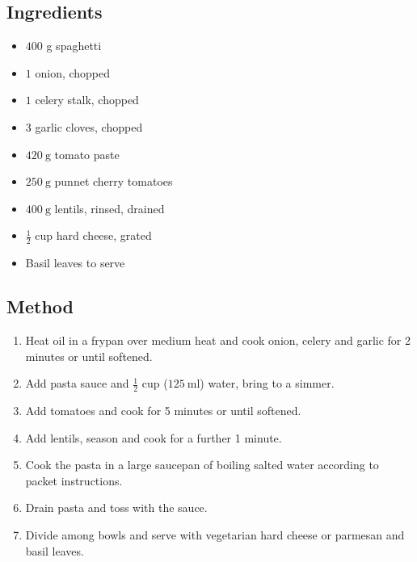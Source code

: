 \documentclass[11pt,a4paper]{article}
\begin{document}
\subsection*{Ingredients}

\begin{itemize}
  \item $ 400 $ \si{\gram} spaghetti
  \item $ 1 $ onion, chopped
  \item $ 1 $ celery stalk, chopped
  \item $ 3 $ garlic cloves, chopped
  \item $ \qty{420}{\gram} $ tomato paste
  \item $ \qty{250}{\gram} $ punnet cherry tomatoes
  \item $ \qty{400}{\gram} $ lentils, rinsed, drained
  \item $ \frac {1} {2} $ cup hard cheese, grated
  \item Basil leaves to serve
\end{itemize}

\medskip

\subsection*{Method}

\begin{enumerate}
  \item Heat oil in a frypan over medium heat and cook onion, celery and garlic for 2 minutes or until softened. 
  \item Add pasta sauce and $ \frac {1}{2} $ cup ($ \qty{125}{\milli\litre} $) water, bring to a simmer.
  \item Add tomatoes and cook for 5 minutes or until softened.
  \item Add lentils, season and cook for a further 1 minute.
  \item Cook the pasta in a large saucepan of boiling salted water according to packet instructions.
  \item Drain pasta and toss with the sauce.
  \item Divide among bowls and serve with vegetarian hard cheese or parmesan and basil leaves.
\end{enumerate}
\end{document}
